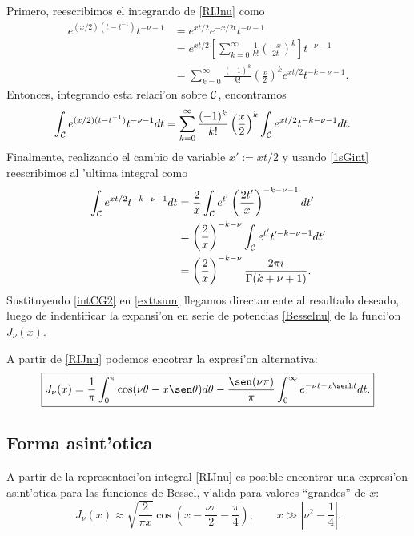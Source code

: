 Primero, reescribimos el integrando de \eqref{RIJnu} como
\begin{align}
e^{(x/2)(t-t^{-1})}t^{-\nu-1} &= e^{xt/2}e^{-x/2t}t^{-\nu-1} \\
&= e^{xt/2}\left[\sum_{k=0}^\infty\frac{1}{k!}\left(\frac{-x}{2t}\right)^k\right]t^{-\nu-1} \\
&= \sum_{k=0}^\infty\frac{(-1)^k}{k!}\left(\frac{x}{2}\right)^ke^{xt/2}t^{-k-\nu-1}. \label{exttsum}
\end{align}
Entonces, integrando esta relaci'on sobre $\cal C$, encontramos
\begin{align}
\int_{\cal C}e^{(x/2)(t-t^{-1})}t^{-\nu-1}dt &= \sum_{k=0}^\infty\frac{(-1)^k}{k!}\left(\frac{x}{2}\right)^k\int_{\cal C}e^{xt/2}t^{-k-\nu-1}dt .
\end{align}
Finalmente, realizando el cambio de variable $x':=xt/2$ y usando \eqref{1sGint} reescribimos al 'ultima integral como
\begin{align}
\int_{\cal C}e^{xt/2}t^{-k-\nu-1}dt &= \frac{2}{x}\int_{\cal C}e^{t'}\left(\frac{2t'}{x}\right)^{-k-\nu-1}dt' \\
&= \left(\frac{2}{x}\right)^{-k-\nu}\int_{\cal C}e^{t'}t'^{-k-\nu-1}dt' \\
&= \left(\frac{2}{x}\right)^{-k-\nu}\frac{2\pi i}{\Gamma(k+\nu+1)}. \label{intCG2}
\end{align}
Sustituyendo \eqref{intCG2} en \eqref{exttsum} llegamos directamente al resultado deseado, luego de indentificar la expansi'on en serie de potencias \eqref{Besselnu} de la funci'on $J_\nu(x)$.

A partir de \eqref{RIJnu} podemos encotrar la expresi'on alternativa:
\begin{equation}
\boxed{J_\nu(x)=\frac{1}{\pi}\int_0^\pi\cos(\nu\theta-x\sen\theta)d\theta-\frac{\sen(\nu\pi)}{\pi}\int_0^\infty e^{-\nu t-x\senh t}dt.}
\end{equation}

\subsection{Forma asint'otica}
A partir de la representaci'on integral \eqref{RIJnu} es posible encontrar una expresi'on asint'otica para las funciones de Bessel, v'alida para valores ``grandes'' de $x$:
\begin{equation}\label{asinJnu}
J_\nu(x)\approx \sqrt{\frac{2}{\pi x}}\cos\left(x-\frac{\nu\pi}{2}-\frac{\pi}{4}\right), 
\qquad x\gg\left|\nu^2-\frac{1}{4}\right|.
\end{equation}

